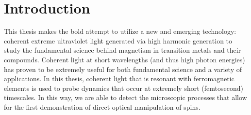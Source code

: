 \chapter{Introduction}
\label{introchap}

This thesis makes the bold attempt to utilize a new and emerging technology: coherent extreme ultraviolet light generated via high harmonic generation to study the fundamental science behind magnetism in transition metals and their compounds. Coherent light at short wavelengths (and thus high photon energies) has proven to be extremely useful for both fundamental science and a variety of applications. In this thesis, coherent light that is resonant with ferromagnetic elements is used to probe dynamics that occur at extremely short (femtosecond) timescales. In this way, we are able to detect the microscopic processes that allow for the first demonstration of direct optical manipulation of spins.


